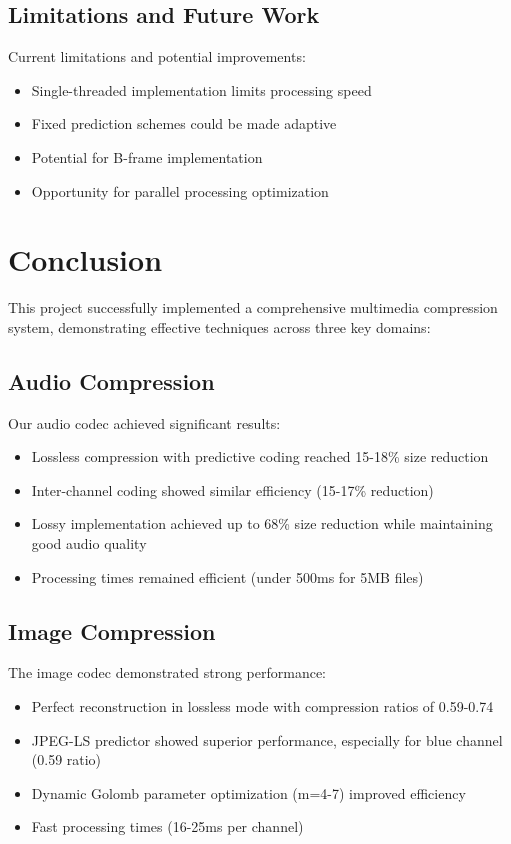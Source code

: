 \documentclass[a4paper,14pt]{article}
\begin{document}
\subsection{Limitations and Future Work}
Current limitations and potential improvements:
\begin{itemize}
    \item Single-threaded implementation limits processing speed
    \item Fixed prediction schemes could be made adaptive
    \item Potential for B-frame implementation
    \item Opportunity for parallel processing optimization
\end{itemize}

\section{Conclusion}
This project successfully implemented a comprehensive multimedia compression system, demonstrating effective techniques across three key domains:

\subsection{Audio Compression}
Our audio codec achieved significant results:
\begin{itemize}
    \item Lossless compression with predictive coding reached 15-18\% size reduction
    \item Inter-channel coding showed similar efficiency (15-17\% reduction)
    \item Lossy implementation achieved up to 68\% size reduction while maintaining good audio quality
    \item Processing times remained efficient (under 500ms for 5MB files)
\end{itemize}

\subsection{Image Compression}
The image codec demonstrated strong performance:
\begin{itemize}
    \item Perfect reconstruction in lossless mode with compression ratios of 0.59-0.74
    \item JPEG-LS predictor showed superior performance, especially for blue channel (0.59 ratio)
    \item Dynamic Golomb parameter optimization (m=4-7) improved efficiency
    \item Fast processing times (16-25ms per channel)
\end{itemize}
\end{document}
